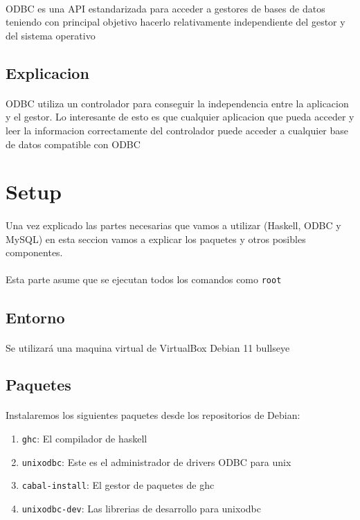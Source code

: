 \documentclass{article}
\begin{document}
	\paragraph{} {\huge O}DBC es una API estandarizada para acceder a gestores de bases de datos teniendo con principal objetivo hacerlo relativamente independiente del gestor y del sistema operativo
	\subsection{Explicacion}
		\paragraph{} ODBC utiliza un controlador para conseguir la independencia entre la aplicacion y el gestor. Lo interesante de esto es que cualquier aplicacion que pueda acceder y leer la informacion correctamente del controlador puede acceder a cualquier base de datos compatible con ODBC

\section{Setup}
	\paragraph{} {\huge U}na vez explicado las partes necesarias que vamos a utilizar (Haskell, ODBC y MySQL) en esta seccion vamos a explicar los paquetes y otros posibles componentes.
	\paragraph{} Esta parte asume que se ejecutan todos los comandos como \verb+root+
	\subsection{Entorno}
		\paragraph{} Se utilizará una maquina virtual de VirtualBox Debian 11 bullseye 
	\subsection{Paquetes}
		\paragraph{} Instalaremos los siguientes paquetes desde los repositorios de Debian:
		\begin{enumerate}
			\item \verb+ghc+: El compilador de haskell 
			\item \verb+unixodbc+: Este es el administrador de drivers ODBC para unix
			\item \verb+cabal-install+: El gestor de paquetes de ghc
			\item \verb+unixodbc-dev+: Las librerias de desarrollo para unixodbc
		\end{enumerate}
\end{document}
